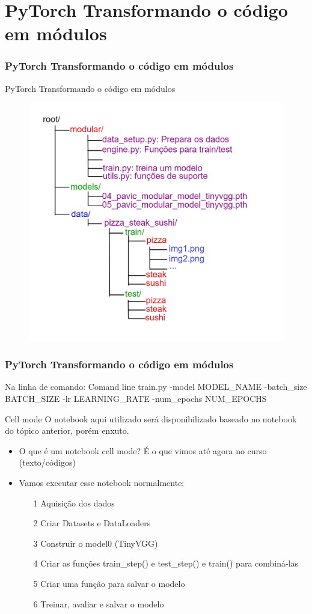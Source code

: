 \documentclass{beamer}
\begin{document}
\section{PyTorch Transformando o código em módulos}
\begin{frame}
	\frametitle{PyTorch Transformando o código em módulos}
	\begin{block}{PyTorch Transformando o código em módulos}
		\begin{figure}
			\centering
			\includegraphics[width=0.7\linewidth]{figures/modular}
		\end{figure}
	\end{block}
\end{frame}
\begin{frame}
	\frametitle{PyTorch Transformando o código em módulos}
	\begin{block}{Na linha de comando: Comand line}
		train.py -model MODEL\_NAME -batch\_size BATCH\_SIZE -lr LEARNING\_RATE -num\_epochs NUM\_EPOCHS
	\end{block}
	\begin{block}{Cell mode}
		O notebook aqui utilizado será disponibilizado baseado no notebook do tópico anterior, porém enxuto.
		\begin{itemize}
			\item O que é um notebook cell mode? É o que vimos até agora no curso (texto/códigos)
			\item Vamos executar esse notebook normalmente:
			\begin{itemize}
				\item[1] Aquisição dos dados
				\item[2] Criar Datasets e DataLoaders
				\item[3] Construir o model0 (TinyVGG)
				\item[4] Criar as funções train\_step() e test\_step() e train() para combiná-las
				\item[5] Criar uma função para salvar o modelo
				\item[6] Treinar, avaliar e salvar o modelo
			\end{itemize}
		\end{itemize}
	\end{block}
\end{frame}
\end{document}
